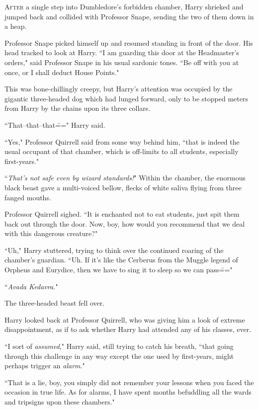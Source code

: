 
\lettrine{A}{fter} a single step into Dumbledore's forbidden chamber, Harry shrieked and jumped back and collided with Professor Snape, sending the two of them down in a heap.

Professor Snape picked himself up and resumed standing in front of the door. His head tracked to look at Harry. ``I am guarding this door at the Headmaster's orders," said Professor Snape in his usual sardonic tones. ``Be off with you at once, or I shall deduct House Points."

This was bone-chillingly creepy, but Harry's attention was occupied by the gigantic three-headed dog which had lunged forward, only to be stopped meters from Harry by the chains upon its three collars.

``That\---that\---that\===" Harry said.

``Yes," Professor Quirrell said from some way behind him, ``that is indeed the usual occupant of that chamber, which is off-limits to all students, especially first-years."

``\emph{That's not safe even by wizard standards!}" Within the chamber, the enormous black beast gave a multi-voiced bellow, flecks of white saliva flying from three fanged mouths.

Professor Quirrell sighed. ``It is enchanted not to eat students, just spit them back out through the door. Now, boy, how would you recommend that we deal with this dangerous creature?"

``Uh," Harry stuttered, trying to think over the continued roaring of the chamber's guardian. ``Uh. If it's like the Cerberus from the Muggle legend of Orpheus and Eurydice, then we have to sing it to sleep so we can pass\==="

``\emph{Avada Kedavra.}"

The three-headed beast fell over.

Harry looked back at Professor Quirrell, who was giving him a look of extreme disappointment, as if to ask whether Harry had attended any of his classes, ever.

``I sort of \emph{assumed}," Harry said, still trying to catch his breath, ``that going through this challenge in any way except the one used by first-years, might perhaps trigger an \emph{alarm}."

``That is a lie, boy, you simply did not remember your lessons when you faced the occasion in true life. As for alarms, I have spent months befuddling all the wards and tripsigns upon these chambers."

